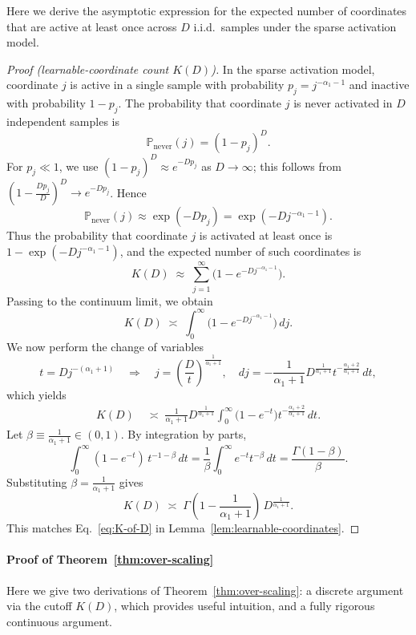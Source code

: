 \documentclass[11pt]{article}
\theoremstyle{plain}
\theoremstyle{definition}
\theoremstyle{remark}
\newcommand{\JSCheck}[1]{#1}
\begin{document}
Here we derive the asymptotic expression for the expected number of coordinates that
are active at least once across $D$ i.i.d.\ samples under the sparse activation
model.


\begin{proof}[Proof (learnable-coordinate count $K(D)$)]
In the sparse activation model, coordinate $j$ is active in a single sample
with probability $p_j = j^{-\alpha_1 - 1}$ and inactive with probability
$1 - p_j$. The probability that coordinate $j$ is never activated in $D$
independent samples is
\[
\mathbb{P}_{\mathrm{never}}(j)
= (1 - p_j)^D.
\]
For $p_j \ll 1$, we use $(1 - p_j)^D \approx e^{-D p_j}$ as $D \to \infty$; this
follows from $(1 - \frac{D p_j}{D})^D \to e^{-D p_j}$. Hence
\[
\mathbb{P}_{\mathrm{never}}(j)
\approx \exp(-D p_j)
= \exp\!\left(-D j^{-\alpha_1 - 1}\right).
\]
Thus the probability that coordinate $j$ is activated at least once is
$1 - \exp(-D j^{-\alpha_1 - 1})$, and the expected number of such coordinates
is
\[
K(D)
\;\approx\;
\sum_{j=1}^\infty
\bigl(1 - e^{-D j^{-\alpha_1-1}}\bigr).
\]
Passing to the continuum limit, we obtain
\[
K(D)
\;\asymp\;
\int_0^\infty \bigl(1 - e^{-D j^{-\alpha_1-1}}\bigr)\, dj.
\]
We now perform the change of variables
\[
t = D j^{-(\alpha_1+1)}
\quad\Longrightarrow\quad
j = \left(\frac{D}{t}\right)^{\frac{1}{\alpha_1+1}},
\quad
dj
= -\frac{1}{\alpha_1+1}
D^{\frac{1}{\alpha_1+1}}
t^{-\frac{\alpha_1+2}{\alpha_1+1}}\, dt,
\]
which yields
\begin{align*}
K(D)
&\;\asymp\;
\frac{1}{\alpha_1+1}
D^{\frac{1}{\alpha_1+1}}
\int_0^\infty \bigl(1 - e^{-t}\bigr) t^{-\frac{\alpha_1+2}{\alpha_1+1}} \, dt.
\end{align*}
Let $\beta \equiv \frac{1}{\alpha_1+1}\in(0,1)$. By integration by parts,
\[
\int_0^\infty (1-e^{-t})\, t^{-1-\beta}\,dt
= \frac{1}{\beta}\int_0^\infty e^{-t} t^{-\beta}\,dt
= \frac{\Gamma(1-\beta)}{\beta}.
\]
Substituting $\beta=\frac{1}{\alpha_1+1}$ gives
\[
K(D)
\;\asymp\;
\Gamma\!\left(1-\frac{1}{\alpha_1+1}\right)\,
D^{\frac{1}{\alpha_1+1}}.
\]
This matches Eq.~\eqref{eq:K-of-D} in Lemma~\ref{lem:learnable-coordinates}.
\end{proof}





\paragraph{Proof of Theorem~\ref{thm:over-scaling}}\label{App:rig-proof}
\JSCheck{Here we give two derivations of Theorem~\ref{thm:over-scaling}: a discrete argument via the cutoff $K(D)$, which provides useful intuition, and a fully rigorous continuous argument.}
\end{document}
